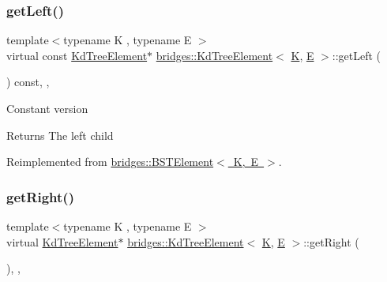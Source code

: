 \subsubsection{\texorpdfstring{getLeft()}{getLeft()}\hspace{0.1cm}{\footnotesize\ttfamily [2/2]}}
{\footnotesize\ttfamily template$<$typename K , typename E $>$ \\
virtual const \mbox{\hyperlink{classbridges_1_1_kd_tree_element}{Kd\+Tree\+Element}}$\ast$ \mbox{\hyperlink{classbridges_1_1_kd_tree_element}{bridges\+::\+Kd\+Tree\+Element}}$<$ \mbox{\hyperlink{namespacebridges_acfb0a4f7877d8f63de3e6862004c50edaa5f3c6a11b03839d46af9fb43c97c188}{K}}, \mbox{\hyperlink{namespacebridges_acfb0a4f7877d8f63de3e6862004c50eda3a3ea00cfc35332cedf6e5e9a32e94da}{E}} $>$\+::get\+Left (\begin{DoxyParamCaption}{ }\end{DoxyParamCaption}) const\hspace{0.3cm}{\ttfamily [inline]}, {\ttfamily [override]}, {\ttfamily [virtual]}}

Constant version

\begin{DoxyReturn}{Returns}
The left child 
\end{DoxyReturn}


Reimplemented from \mbox{\hyperlink{classbridges_1_1_b_s_t_element_a2abcfb991f6cc377da2bd9217319fc9c}{bridges\+::\+B\+S\+T\+Element$<$ K, E $>$}}.

\mbox{\label{classbridges_1_1_kd_tree_element_a8e1090891a720231c2009d1d222471e9}} 
\subsubsection{\texorpdfstring{getRight()}{getRight()}\hspace{0.1cm}{\footnotesize\ttfamily [1/2]}}
{\footnotesize\ttfamily template$<$typename K , typename E $>$ \\
virtual \mbox{\hyperlink{classbridges_1_1_kd_tree_element}{Kd\+Tree\+Element}}$\ast$ \mbox{\hyperlink{classbridges_1_1_kd_tree_element}{bridges\+::\+Kd\+Tree\+Element}}$<$ \mbox{\hyperlink{namespacebridges_acfb0a4f7877d8f63de3e6862004c50edaa5f3c6a11b03839d46af9fb43c97c188}{K}}, \mbox{\hyperlink{namespacebridges_acfb0a4f7877d8f63de3e6862004c50eda3a3ea00cfc35332cedf6e5e9a32e94da}{E}} $>$\+::get\+Right (\begin{DoxyParamCaption}{ }\end{DoxyParamCaption})\hspace{0.3cm}{\ttfamily [inline]}, {\ttfamily [override]}, {\ttfamily [virtual]}}

